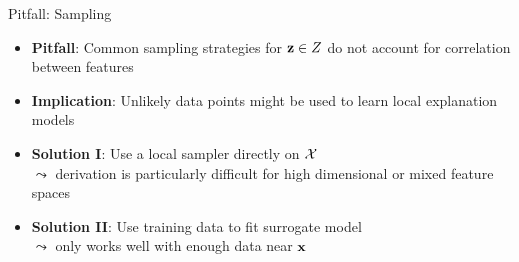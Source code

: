 \documentclass[11pt,compress,t,notes=noshow, aspectratio=169, xcolor=table]{beamer}
\begin{document}
\begin{frame}[c]{Pitfall: Sampling}
	\begin{itemize}
	\itemsep1em
	  \item \textbf{Pitfall}: Common sampling strategies for $\mathbf{z} \in Z$ do not account for correlation between features 
      \item \textbf{Implication}:  Unlikely data points might be used to learn local explanation models
      \pause
      \item \textbf{Solution I}: Use a local sampler directly on $\mathcal{X}$\\
      $\leadsto$ derivation is particularly difficult for high dimensional or mixed feature spaces 
      \item \textbf{Solution II}: Use training data to fit surrogate model\\
      $\leadsto$ only works well with enough data near $\mathbf{x}$
    \end{itemize}
    
\end{frame}
\end{document}

